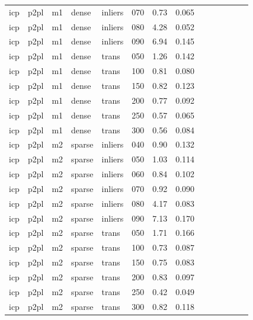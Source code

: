 \begin{table}[htbp]
\begin{tabular}{llllllrrrrrrrr}
  icp & p2pl & m1 & dense & inliers & 070 & 0.73 & 0.065 \\
  icp & p2pl & m1 & dense & inliers & 080 & 4.28 & 0.052 \\
  icp & p2pl & m1 & dense & inliers & 090 & 6.94 & 0.145 \\
  icp & p2pl & m1 & dense & trans & 050 & 1.26 & 0.142 \\
  icp & p2pl & m1 & dense & trans & 100 & 0.81 & 0.080 \\
  icp & p2pl & m1 & dense & trans & 150 & 0.82 & 0.123 \\
  icp & p2pl & m1 & dense & trans & 200 & 0.77 & 0.092 \\
  icp & p2pl & m1 & dense & trans & 250 & 0.57 & 0.065 \\
  icp & p2pl & m1 & dense & trans & 300 & 0.56 & 0.084 \\
  icp & p2pl & m2 & sparse & inliers & 040 & 0.90 & 0.132 \\
  icp & p2pl & m2 & sparse & inliers & 050 & 1.03 & 0.114 \\
  icp & p2pl & m2 & sparse & inliers & 060 & 0.84 & 0.102 \\
  icp & p2pl & m2 & sparse & inliers & 070 & 0.92 & 0.090 \\
  icp & p2pl & m2 & sparse & inliers & 080 & 4.17 & 0.083 \\
  icp & p2pl & m2 & sparse & inliers & 090 & 7.13 & 0.170 \\
  icp & p2pl & m2 & sparse & trans & 050 & 1.71 & 0.166 \\
  icp & p2pl & m2 & sparse & trans & 100 & 0.73 & 0.087 \\
  icp & p2pl & m2 & sparse & trans & 150 & 0.75 & 0.083 \\
  icp & p2pl & m2 & sparse & trans & 200 & 0.83 & 0.097 \\
  icp & p2pl & m2 & sparse & trans & 250 & 0.42 & 0.049 \\
  icp & p2pl & m2 & sparse & trans & 300 & 0.82 & 0.118 \\
\bottomrule
\end{tabular}
\end{table}
